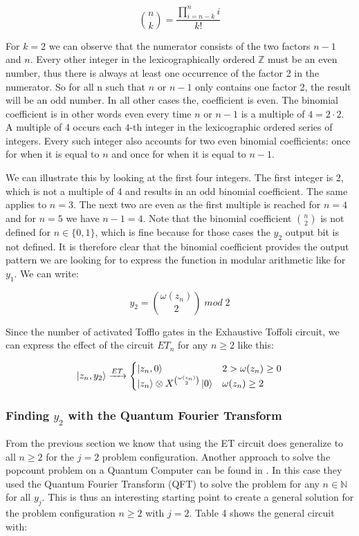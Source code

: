 \documentclass[12pt,a4paper]{article}
\begin{document}
\[\binom{n}{k} = \frac{\prod^{n}_{i = n-k}i}{k!}\]

For \(k=2\) we can observe that the numerator consists of the two factors \(n-1\) and \(n\). Every other integer in the lexicographically ordered \(\mathbb{Z}\) must be an even number, thus there is always at least one occurrence of the factor 2 in the numerator. So for all n such that \(n\) or \(n-1\) only contains one factor 2, the result will be an odd number. In all other cases the, coefficient is even. The binomial coefficient is in other words even every time \(n\) or \(n-1\) is a multiple of \(4 = 2 \cdot 2\). A multiple of 4 occurs each \(4\)-th integer in the lexicographic ordered series of integers. Every such integer also accounts for two even binomial coefficients: once for when it is equal to \(n\) and once for when it is equal to \(n-1\). 

We can illustrate this by looking at the first four integers. The first integer is 2, which is not a multiple of 4 and results in an odd binomial coefficient. The same applies to \(n=3\). The next two are even as the first multiple is reached for \(n=4\) and for \(n=5\) we have \(n-1 = 4\). Note that the binomial coefficient \(\binom{n}{2}\) is not defined for \(n \in \{0,1\}\), which is fine because for those cases the \(y_2\) output bit is not defined. It is therefore clear that the binomial coefficient provides the output pattern we are looking for to express the function in modular arithmetic like for \(y_1\). We can write:

\[y_2 = \binom{\omega(z_n)}{2} \; mod \; 2\]

Since the number of activated Tofflo gates in the Exhaustive Toffoli circuit, we can express the effect of the circuit \(ET_n\) for any \(n \ge 2\) like this:

\[\ket{z_n, y_2} \xrightarrow{ET} 
    \begin{cases}
    \ket{z_n, 0} & 2 > \omega(z_n) \ge 0 \\
    \ket{z_n} \otimes X^{\binom{\omega(z_n)}{2}}\ket{0} & \omega(z_n) \ge 2
    \end{cases}
\]

\subsubsection{Finding \(y_2\)  with the Quantum Fourier Transform}
From the previous section we know that using the ET circuit does generalize to all \(n \ge 2\) for the \(j=2\) problem configuration. Another approach to solve the popcount problem on a Quantum Computer can be found in \cite{mit_problem_set_2010}. In this case they used the Quantum Fourier Transform (QFT) to solve the problem for any \(n \in \mathbb{N}\) for all \(y_j\). This is thus an interesting starting point to create a general solution for the problem configuration \(n \ge 2\) with \(j = 2\). Table 4 shows the general circuit with:
\end{document}

